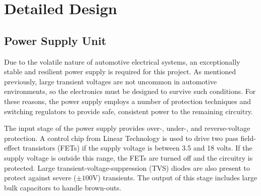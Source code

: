 \chapter{Detailed Design}
\label{chap:detailed-design}




\section{Power Supply Unit}
Due to the volatile nature of automotive electrical systems, an exceptionally stable and 
resilient power supply is required for this project.  As mentioned previously, large
transient voltages are not uncommon in automotive environments, so the electronics must
be designed to survive such conditions.  For these reasons, the power supply employs 
a number of protection techniques and switching regulators to provide safe, consistent 
power to the remaining circuitry.

The input stage of the power supply provides over-, under-, and reverse-voltage
protection.  A control chip from Linear Technology \cite{ltc4365ds} is used to drive two pass
field-effect transistors (FETs) if the supply voltage is between 3.5 and 18 volts.  If the supply voltage
is outside this range, the FETs are turned off and the circuitry is
protected.  Large transient-voltage-suppression (TVS) diodes are also present to
protect against severe ($\pm 100$V) transients.  The output of this stage includes
large bulk capacitors to handle brown-outs.

